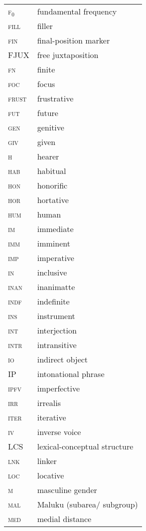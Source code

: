 \begin{longtable}{l l}
 \textsc{f$_0$} & fundamental frequency \\
 \textsc{fill}  & filler \\
 \textsc{fin}  & final-position marker \\
 \textsc{FJUX}  & free juxtaposition \\
 \textsc{fn}  & finite \\
 \textsc{foc}  & focus \\
 \textsc{frust}  & frustrative \\
 \textsc{fut}  & future \\
 \textsc{gen}  & genitive \\
 \textsc{giv}  & given \\
 \textsc{h}  & hearer \\
 \textsc{hab}  & habitual \\
 \textsc{hon}  & honorific \\
 \textsc{hor}  & hortative \\
 \textsc{hum}  & human \\
 \textsc{im}  & immediate \\
 \textsc{imm}  & imminent \\
 \textsc{imp}  & imperative \\
 \textsc{in}  & inclusive \\
 \textsc{inan}  & inanimatte \\
 \textsc{indf}  & indefinite \\
 \textsc{ins}  & instrument \\
 \textsc{int}  & interjection \\
 \textsc{intr}  & intransitive \\
 \textsc{io}  & indirect object \\
 \textsc{IP}  & intonational phrase \\
 \textsc{ipfv}  & imperfective \\
 \textsc{irr}  & irrealis \\
 \textsc{iter}  & iterative \\
 \textsc{iv}  & inverse voice \\
 \textsc{LCS}  & lexical-conceptual structure \\
 \textsc{lnk}  & linker \\
 \textsc{loc}  & locative \\
 \textsc{m}  & masculine gender \\
 \textsc{mal}  & Maluku (subarea/ subgroup) \\
 \textsc{med}  & medial distance \\

\end{longtable}
